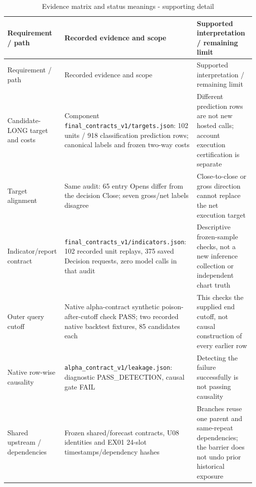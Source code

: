 \begin{longtable}[]{@{}
  >{\raggedright\arraybackslash}p{}
  >{\raggedright\arraybackslash}p{}
  >{\raggedright\arraybackslash}p{}@{}}
\caption{Evidence matrix and status meanings - supporting detail}\label{tab:E_verification:1}\tabularnewline
\toprule\noalign{}
Requirement / path
 & Recorded evidence and scope
 & Supported interpretation / remaining limit
 \\
\midrule\noalign{}
\endfirsthead
\toprule\noalign{}
Requirement / path
 & Recorded evidence and scope
 & Supported interpretation / remaining limit
 \\
\midrule\noalign{}
\endhead
\bottomrule\noalign{}
\endlastfoot
Candidate-LONG target and costs & Component \texttt{final\_\allowbreak{}contracts\_\allowbreak{}v1/\allowbreak{}targets.\allowbreak{}json}: 102 units / 918 classification prediction rows; canonical labels and frozen two-way costs & Different prediction rows are not new hosted calls; account execution certification is separate \\
Target alignment & Same audit: 65 entry Opens differ from the decision Close; seven gross/net labels disagree & Close-to-close or gross direction cannot replace the net execution target \\
Indicator/report contract & \texttt{final\_\allowbreak{}contracts\_\allowbreak{}v1/\allowbreak{}indicators.\allowbreak{}json}: 102 recorded unit replays, 375 saved Decision requests, zero model calls in that audit & Descriptive frozen-sample checks, not a new inference collection or independent chart truth \\
Outer query cutoff & Native alpha-contract synthetic poison-after-cutoff check PASS; two recorded native backtest fixtures, 85 candidates each & This checks the supplied end cutoff, not causal construction of every earlier row \\
Native row-wise causality & \texttt{alpha\_\allowbreak{}contract\_\allowbreak{}v1/\allowbreak{}leakage.\allowbreak{}json}: diagnostic PASS\_\allowbreak{}DETECTION, causal gate FAIL & Detecting the failure successfully is not passing causality \\
Shared upstream / dependencies & Frozen shared/forecast contracts, U08 identities and EX01 24-slot timestamps/dependency hashes & Branches reuse one parent and same-repeat dependencies; the barrier does not undo prior historical exposure \\

\end{longtable}
